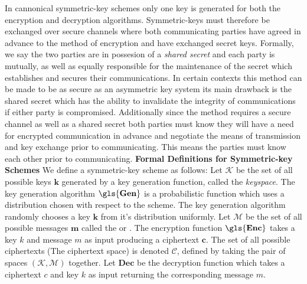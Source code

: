 In cannonical symmetric-key schemes only one key is generated for both the encryption and decryption algorithms. Symmetric-keys must therefore be exchanged over secure channels where both communicating parties have agreed in advance to the method of encryption and have exchanged secret keys. 
\newline
Formally, we say the two parties are in possesion of a \textit{shared secret} and each party is mutually, as well as equally responsible for the maintenance of the secret which establishes and secures their communications. 
In certain contexts this method can be made to be as secure as an asymmetric key system its main drawback is the shared secret which has the ability to invalidate the integrity of communications if either party is compromised.
\newline
Additionally since the method requires a secure channel as well as a shared secret both parties must know they will have a need for encrypted communication in advance and negotiate the means of transmission and key exchange prior to communicating. This means the parties must know each other prior to communicating. 
\newline
\textbf{Formal Definitions for Symmetric-key Schemes}
\newline
We define a symmetric-key scheme as follows:
\newline
Let $\mathbf{\mathcal{K}}$ be the set of all possible keys $\mathbf{k}$  generated by a key generation function, called the \textit{\gls{keyspace}}.
\newline
The key generation algorithm $\mathbf{\gls{Gen}}$ is a probabilistic function which uses a distribution chosen with respect to the scheme.
\newline
The key generation algorithm randomly chooses a key $\mathbf{k}$ from it's distribution uniformly. 
\medskip
Let $\mathbf{\mathcal{M}}$ be the set of all possible messages $\mathbf{m}$ called the  or \textit{}.
\newline
The encryption function $\mathbf{\gls{Enc}}$ takes a key $k$ and message $m$ as input producing a ciphertext $\mathbf{c}$.
\newline
The set of all possible ciphertexts (The \gls{ciphertext space}) is denoted $\mathbf{\mathcal{C}}$, defined by taking the pair of spaces $\mathbf{(\mathcal{K}, \mathcal{M})}$ together. 
\newline
Let $\mathbf{Dec}$ be the decryption function which takes a ciphertext $c$ and key $k$ as input returning the corresponding message $m$.
\bigskip

